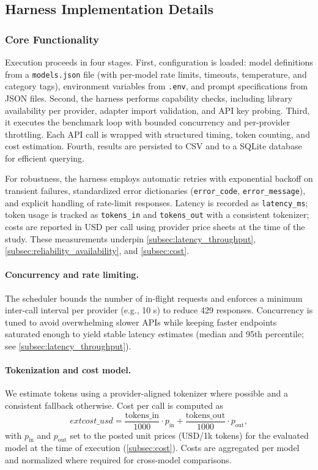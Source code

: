 \subsection{Harness Implementation Details}
\label{subsec:harness_implementation}

\subsubsection{Core Functionality}
\label{subsubsec:core_functionality}

Execution proceeds in four stages. First, configuration is loaded: model definitions from a \verb|models.json| file (with per-model rate limits, timeouts, temperature, and category tags), environment variables from \verb|.env|, and prompt specifications from JSON files. Second, the harness performs capability checks, including library availability per provider, adapter import validation, and API key probing. Third, it executes the benchmark loop with bounded concurrency and per-provider throttling. Each API call is wrapped with structured timing, token counting, and cost estimation. Fourth, results are persisted to CSV and to a SQLite database for efficient querying.

For robustness, the harness employs automatic retries with exponential backoff on transient failures, standardized error dictionaries (\verb|error_code|, \verb|error_message|), and explicit handling of rate-limit responses. Latency is recorded as \verb|latency_ms|; token usage is tracked as \verb|tokens_in| and \verb|tokens_out| with a consistent tokenizer; costs are reported in USD per call using provider price sheets at the time of the study. These measurements underpin \cref{subsec:latency_throughput}, \cref{subsec:reliability_availability}, and \cref{subsec:cost}.

\paragraph{Concurrency and rate limiting.} The scheduler bounds the number of in-flight requests and enforces a minimum inter-call interval per provider (e.g., 10 s) to reduce 429 responses. Concurrency is tuned to avoid overwhelming slower APIs while keeping faster endpoints saturated enough to yield stable latency estimates (median and 95th percentile; see \cref{subsec:latency_throughput}).

\paragraph{Tokenization and cost model.} We estimate tokens using a provider-aligned tokenizer where possible and a consistent fallback otherwise. Cost per call is computed as
\begin{equation*}
	ext{cost\_usd} = \frac{\text{tokens\_in}}{1000} \cdot p_{\text{in}} + \frac{\text{tokens\_out}}{1000} \cdot p_{\text{out}},
\end{equation*}
with $p_{\text{in}}$ and $p_{\text{out}}$ set to the posted unit prices (USD/1k tokens) for the evaluated model at the time of execution (\cref{subsec:cost}). Costs are aggregated per model and normalized where required for cross-model comparisons.

